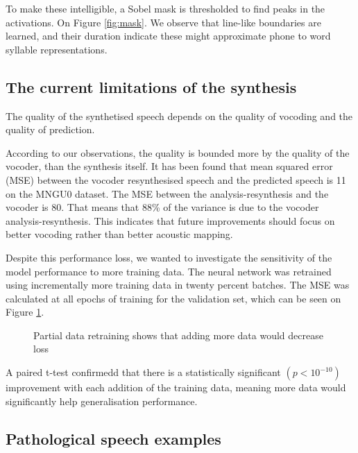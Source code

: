 \documentclass[a4paper]{article}
\begin{document}
To make these intelligible, a Sobel mask is thresholded to find peaks in the activations.
On Figure \ref{fig:mask}. We observe that line-like boundaries are learned, and their duration indicate these might approximate phone to word syllable representations. 

\subsection{The current limitations of the synthesis} \label{section:limitations}
The quality of the synthetised speech depends on the quality of vocoding and
the quality of prediction.

According to our observations, the quality is bounded more by the
quality of the vocoder, than the synthesis itself. It has been found that mean squared error (MSE) between the vocoder resynthesised speech and the predicted speech is 11 on the MNGU0 dataset. The MSE between the analysis-resynthesis and the vocoder is 80. That means that 88\% of the variance
is due to the vocoder analysis-resynthesis. This indicates that
future improvements should focus on better vocoding rather than better
acoustic mapping.

Despite this performance loss, we wanted to investigate the sensitivity of the model performance to more
training data. The neural network was retrained using incrementally more training data in twenty
percent batches. The MSE was calculated at all epochs of training for the validation set, which
can be seen on Figure \ref{learning_curve}.

\begin{figure}[t]
  \begin{center}
    \scalebox{0.50}{}
    \caption{Partial data retraining shows that adding more data would
      decrease loss}
      \label{learning_curve}
    \end{center}
    \vspace{-2em}
\end{figure}


A paired t-test confirmedd that there is
a statistically significant \( (p < 10^{-10}) \)  improvement with each addition of the training data,
meaning more data would significantly help generalisation performance.

\subsection{Pathological speech examples}
\end{document}

